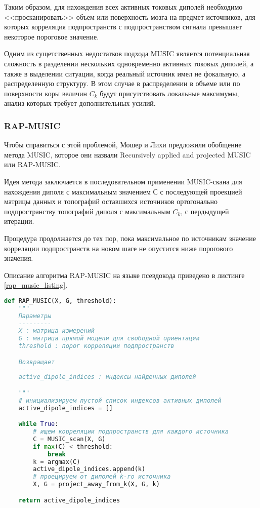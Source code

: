 Таким образом, для нахождения всех активных токовых диполей необходимо
<<просканировать>> объем или поверхность мозга на предмет источников, для которых
корреляция подпространств с подпространством сигнала превышает некоторое
пороговое значение. 

Одним из сущетственных недостатков подхода MUSIC является потенциальная
сложность в разделении нескольких одновременно активных токовых диполей, а также
в выделении ситуации, когда реальный источник имел не фокальную, а распределенную
структуру. В этом случае в распределении в объеме или по поверхности коры
величин $C_k$ будут присутствовать локальные максимумы, анализ которых требует дополнительных
усилий.


\subsubsection{RAP-MUSIC}
Чтобы справиться с этой проблемой, Мошер и Лихи предложили обобщение метода MUSIC, которое
они назвали Recursively applied and projected MUSIC или RAP-MUSIC.

Идея метода заключается в последовательном применении MUSIC-скана для нахождения
диполя с максимальным значением $С$ с последующей проекцией матрицы данных и топографий оставшихся источников
ортогонально подпространству топографий диполя с максимальным $C_k$, с пердыдущей итерации.

Процедура продолжается до тех пор, пока максимальное по источникам значение корреляции подпространств
на новом шаге не опустится ниже порогового значения.

Описание алгоритма RAP-MUSIC на языке псевдокода приведено в листинге \ref{rap_music_listing}.

\begin{ListingEnv}[!h]
    \begin{lstlisting}[language=Python]
def RAP_MUSIC(X, G, threshold):
    """
    Параметры
    ---------
    X : матрица измерений
    G : матрица прямой модели для свободной ориентации
    threshold : порог корреляции подпространств

    Возвращает
    ----------
    active_dipole_indices : индексы найденных диполей

    """
    # инициализируем пустой список индексов активных диполей
    active_dipole_indices = []

    while True:
        # ищем корреляции подпространств для каждого источника
        C = MUSIC_scan(X, G)
        if max(C) < threshold:
            break
        k = argmax(C)
        active_dipole_indices.append(k) 
        # проецируем от диполей k-го источника
        X, G = project_away_from_k(X, G, k) 

    return active_dipole_indices
    \end{lstlisting}
    \label{rap_music_listing}
\end{ListingEnv}

